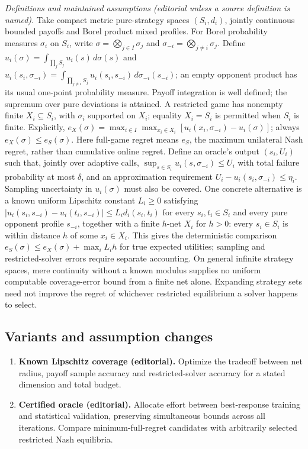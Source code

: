 \documentclass[11pt,a4paper]{article}
\begin{document}
\emph{Definitions and maintained assumptions (editorial unless a source definition is named).} Take compact metric pure-strategy spaces \((S_i,d_i)\), jointly continuous bounded payoffs and Borel product mixed profiles. For Borel probability measures \(\sigma_i\) on \(S_i\), write \(\sigma=\bigotimes_{j\in I}\sigma_j\) and \(\sigma_{-i}=\bigotimes_{j\ne i}\sigma_j\). Define \(u_i(\sigma)=\int_{\prod_jS_j}u_i(s)\,d\sigma(s)\) and \(u_i(s_i,\sigma_{-i})=\int_{\prod_{j\ne i}S_j}u_i(s_i,s_{-i})\,d\sigma_{-i}(s_{-i})\); an empty opponent product has its usual one-point probability measure. Payoff integration is well defined; the supremum over pure deviations is attained. A restricted game has nonempty finite \(X_i\subseteq S_i\), with \(\sigma_i\) supported on \(X_i\); equality \(X_i=S_i\) is permitted when \(S_i\) is finite. Explicitly, \(e_X(\sigma)=\max_{i\in I}\max_{x_i\in X_i}[u_i(x_i,\sigma_{-i})-u_i(\sigma)]\); always \(e_X(\sigma)\le e_S(\sigma)\). Here full-game regret means \(e_S\), the maximum unilateral Nash regret, rather than cumulative online regret. Define an oracle’s output \((s_i,U_i)\) such that, jointly over adaptive calls, \(\sup_{s\in S_i}u_i(s,\sigma_{-i})\le U_i\) with total failure probability at most \(\delta\), and an approximation requirement \(U_i-u_i(s_i,\sigma_{-i})\le\eta_i\). Sampling uncertainty in \(u_i(\sigma)\) must also be covered. One concrete alternative is a known uniform Lipschitz constant \(L_i\geq0\) satisfying \(|u_i(s_i,s_{-i})-u_i(t_i,s_{-i})|\le L_i d_i(s_i,t_i)\) for every \(s_i,t_i\in S_i\) and every pure opponent profile \(s_{-i}\), together with a finite \(h\)-net \(X_i\) for \(h>0\): every \(s_i\in S_i\) is within distance \(h\) of some \(x_i\in X_i\). This gives the deterministic comparison \(e_S(\sigma)\le e_X(\sigma)+\max_iL_i h\) for true expected utilities; sampling and restricted-solver errors require separate accounting. On general infinite strategy spaces, mere continuity without a known modulus supplies no uniform computable coverage-error bound from a finite net alone. Expanding strategy sets need not improve the regret of whichever restricted equilibrium a solver happens to select.
\subsection*{Variants and assumption changes}
\begin{enumerate}
\item \textbf{Known Lipschitz coverage (editorial).} Optimize the tradeoff between net radius, payoff sample accuracy and restricted-solver accuracy for a stated dimension and total budget.
\item \textbf{Certified oracle (editorial).} Allocate effort between best-response training and statistical validation, preserving simultaneous bounds across all iterations. Compare minimum-full-regret candidates with arbitrarily selected restricted Nash equilibria.
\end{enumerate}
\end{document}
